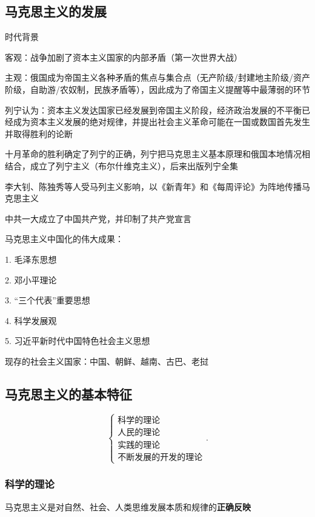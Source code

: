 \subsection{马克思主义的发展}%
\label{sub:马克思主义的发展}
\begin{notation}
    时代背景

    客观：战争加剧了资本主义国家的内部矛盾（第一次世界大战）

    主观：俄国成为帝国主义各种矛盾的焦点与集合点（无产阶级/封建地主阶级/资产阶级，自助游/农奴制，民族矛盾等），因此成为了帝国主义提醒等中最薄弱的环节
\end{notation}
列宁认为：资本主义发达国家已经发展到帝国主义阶段，经济政治发展的不平衡已经成为资本主义发展的绝对规律，并提出社会主义革命可能在一国或数国首先发生并取得胜利的论断

\begin{notation}
    十月革命的胜利确定了列宁的正确，列宁把马克思主义基本原理和俄国本地情况相结合，成立了列宁主义（布尔什维克主义），后来出版列宁全集
\end{notation}
李大钊、陈独秀等人受马列主义影响，以《新青年》和《每周评论》为阵地传播马克思主义

中共一大成立了中国共产党，并印制了共产党宣言

\begin{notation}
    马克思主义中国化的伟大成果：

    1. 毛泽东思想

    2. 邓小平理论

    3. “三个代表”重要思想

    4. 科学发展观

    5. 习近平新时代中国特色社会主义思想
\end{notation}
\begin{notation}
    现存的社会主义国家：中国、朝鲜、越南、古巴、老挝
\end{notation}

\subsection{马克思主义的基本特征}%
\label{sub:马克思主义的基本特征}
\[
    \begin{cases}
        \mbox{科学的理论}\\ 
        \mbox{人民的理论}\\ 
        \mbox{实践的理论}\\ 
        \mbox{不断发展的开发的理论}
    \end{cases}
.\] 
\subsubsection{科学的理论}%
\label{subsub:科学的理论}
马克思主义是对自然、社会、人类思维发展本质和规律的\textbf{正确反映}

